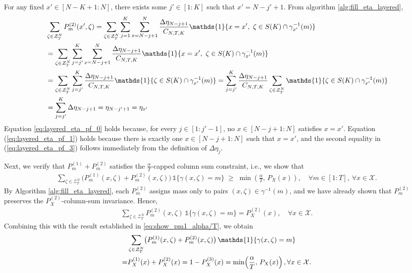 \documentclass[11pt,letterpaper]{article}
\newcommand{\cX}{\mathcal{X}}
\newcommand{\cZ}{\mathcal{Z}}
\begin{document}
For any fixed $x' \in [N-K+1:N]$, there exists some $j' \in [1:K]$ such that $x' = N - j' + 1$. From algorithm \ref{alg:fill_eta_layered}, 
\begin{align}
    & \sum_{\zeta \in \cZ^N_T} P_m^{(2)}(x', \zeta) = \sum_{\zeta \in \cZ^N_T} \sum_{j=1}^{K} \sum_{x = N-j+1}^N \frac{\Delta \eta_{N-j+1}}{C_{N,T,K}} \mathds{1}\{x = x', ~ \zeta \in S(K) \cap \gamma^{-1}_{x'}(m) \}  \notag \\
    & =  \sum_{\zeta \in \cZ^N_T} \sum_{j=j'}^{K} \sum_{x = N-j+1}^N \frac{\Delta \eta_{N-j+1}}{C_{N,T,K}} \mathds{1}\{x = x', ~ \zeta \in S(K) \cap \gamma^{-1}_{x'}(m) \}  \label{eq:layered_eta_pf_0} \\ 
    & = \sum_{\zeta \in \cZ^N_T} \sum_{j=j'}^{K} \frac{\Delta \eta_{N-j+1}}{C_{N,T,K}}  \mathds{1}\{ \zeta \in S(K) \cap \gamma^{-1}_{x'}(m) \} =  \sum_{j=j'}^{K} \frac{\Delta \eta_{N-j+1}}{C_{N,T,K}}  \sum_{\zeta \in \cZ^N_T} \mathds{1}\{ \zeta \in S(K) \cap \gamma^{-1}_{x'}(m) \}\label{eq:layered_eta_pf_1}\\
    & = \sum_{j=j'}^{K} \Delta \eta_{N-j+1} = \eta_{N-j'+1} = \eta_{x'} \label{eq:layered_eta_pf_3} 
\end{align}
Equation \eqref{eq:layered_eta_pf_0} holds because, for every $j \in [1:j'-1]$, no $x \in [N-j+1:N]$ satisfies $x = x'$. Equation (\ref{eq:layered_eta_pf_1}) holds because there is exactly one $x \in [N-j+1:N]$ such that $x = x'$, and the second equality in (\ref{eq:layered_eta_pf_3}) follows immediately from the definition of $\Delta \eta_j$.

Next, we verify that $P^{(1)}_m + P^{(2)}_m$ satisfies the $\tfrac{\alpha}{T}$-capped column sum constraint, i.e., we show that
\begin{align}
    \sum_{\zeta \in \cZ^N_T} \bigl(P^{(1)}_m(x,\zeta) + P^{(2)}_m(x,\zeta)\bigr)\,\mathds{1}\{\gamma(x,\zeta) = m\} \;\ge\; \min\!\left(\frac{\alpha}{T},\,P_X(x)\right),\quad \forall m \in [1:T],\ \forall x \in \cX.
\end{align}
By Algorithm \ref{alg:fill_eta_layered}, each $P_m^{(2)}$ assigns mass only to pairs $(x,\zeta) \in \gamma^{-1}(m)$, and we have already shown that $P_m^{(2)}$ preserves the $P_X^{(2)}$-column-sum invariance. Hence,
\begin{align}
    \sum_{\zeta \in \cZ^N_T} P_m^{(2)}(x,\zeta)\,\mathds{1}\{\gamma(x,\zeta) = m\}= P_X^{(2)}(x), \quad \forall x \in \cX.
\end{align}
Combining this with the result established in \eqref{eq:show_pm1_alpha/T}, we obtain
\begin{align}
    & \sum_{\zeta \in \cZ^N_T} \bigl(P^{(1)}_m(x,\zeta) + P^{(2)}_m(x,\zeta)\bigr)\,\mathds{1}\{\gamma(x,\zeta) = m\} \notag \\
    = & P_X^{(1)}(x) + P_X^{(2)}(x)= 1 - P_X^{(3)}(x)=\min\!\left(\frac{\alpha}{T},\,P_X(x)\right), \forall x \in \cX.
\end{align}
\end{document}
